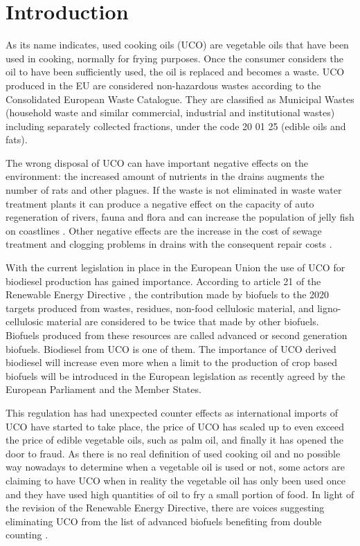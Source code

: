 \documentclass[sustainability,article,submit,moreauthors,pdftex,12pt,a4paper]{mdpi}
\begin{document}

\section{Introduction}

As its name indicates, used cooking oils (UCO) are vegetable oils that have been used in cooking, normally for frying purposes. Once the consumer considers the oil to have been sufficiently used, the oil is replaced and becomes a waste. UCO produced in the EU are considered non-hazardous wastes according to the Consolidated European Waste Catalogue. They are classified as Municipal Wastes (household waste and similar commercial, industrial and institutional wastes) including separately collected fractions, under the code 20 01 25 (edible oils and fats).

The wrong disposal of UCO can have important negative effects on the environment: the increased amount of nutrients in the drains augments the number of rats and other plagues. If the waste is not eliminated in waste water treatment plants it can produce a negative effect on the capacity of auto regeneration of rivers, fauna and flora and can increase the population of jelly fish on coastlines \cite{LifeECOBUS}. Other negative effects are the increase in the cost of sewage treatment and clogging problems in drains with the consequent repair costs \cite{LifeECOBUS}.

With the current legislation in place in the European Union the use of UCO for biodiesel production has gained importance. According to article 21 of the Renewable Energy Directive \cite{Directive2009/28/EC}, the contribution made by biofuels to the 2020 targets produced from wastes, residues, non-food cellulosic material, and ligno-cellulosic material are considered to be twice that made by other biofuels. Biofuels produced from these resources are called advanced or second generation biofuels. Biodiesel from UCO is one of them. The importance of UCO derived biodiesel will increase even more when a limit to the production of crop based biofuels will be introduced in the European legislation as recently agreed by the European Parliament and the Member States.

This regulation has had unexpected counter effects \cite{Bailey2013,ePURE2013,EBTP2011} as international imports of UCO have started to take place, the price of UCO has scaled up to even exceed the price of edible vegetable oils, such as palm oil, and finally it has opened the door to fraud. As there is no real definition of used cooking oil and no possible way nowadays to determine when a vegetable oil is used or not, some actors are claiming to have UCO when in reality the vegetable oil has only been used once and they have used high quantities of oil to fry a small portion of food. In light of the revision of the Renewable Energy Directive, there are voices suggesting eliminating UCO from the list of advanced biofuels benefiting from double counting \cite{ePURE2013}.
\end{document}
